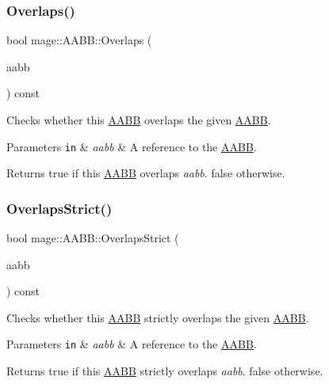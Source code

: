 \subsubsection{\texorpdfstring{Overlaps()}{Overlaps()}}
{\footnotesize\ttfamily bool mage\+::\+A\+A\+B\+B\+::\+Overlaps (\begin{DoxyParamCaption}\item[{const \hyperlink{structmage_1_1_a_a_b_b}{A\+A\+BB} \&}]{aabb }\end{DoxyParamCaption}) const}

Checks whether this \hyperlink{structmage_1_1_a_a_b_b}{A\+A\+BB} overlaps the given \hyperlink{structmage_1_1_a_a_b_b}{A\+A\+BB}.


\begin{DoxyParams}[1]{Parameters}
\mbox{\tt in}  & {\em aabb} & A reference to the \hyperlink{structmage_1_1_a_a_b_b}{A\+A\+BB}. \\
\hline
\end{DoxyParams}
\begin{DoxyReturn}{Returns}
{\ttfamily true} if this \hyperlink{structmage_1_1_a_a_b_b}{A\+A\+BB} overlaps {\itshape aabb}. {\ttfamily false} otherwise. 
\end{DoxyReturn}
\hypertarget{structmage_1_1_a_a_b_b_ae8e6eca9c5e30015a91ab2e900594bfc}{}\label{structmage_1_1_a_a_b_b_ae8e6eca9c5e30015a91ab2e900594bfc} 
\subsubsection{\texorpdfstring{Overlaps\+Strict()}{OverlapsStrict()}}
{\footnotesize\ttfamily bool mage\+::\+A\+A\+B\+B\+::\+Overlaps\+Strict (\begin{DoxyParamCaption}\item[{const \hyperlink{structmage_1_1_a_a_b_b}{A\+A\+BB} \&}]{aabb }\end{DoxyParamCaption}) const}

Checks whether this \hyperlink{structmage_1_1_a_a_b_b}{A\+A\+BB} strictly overlaps the given \hyperlink{structmage_1_1_a_a_b_b}{A\+A\+BB}.


\begin{DoxyParams}[1]{Parameters}
\mbox{\tt in}  & {\em aabb} & A reference to the \hyperlink{structmage_1_1_a_a_b_b}{A\+A\+BB}. \\
\hline
\end{DoxyParams}
\begin{DoxyReturn}{Returns}
{\ttfamily true} if this \hyperlink{structmage_1_1_a_a_b_b}{A\+A\+BB} strictly overlaps {\itshape aabb}. {\ttfamily false} otherwise. 
\end{DoxyReturn}


